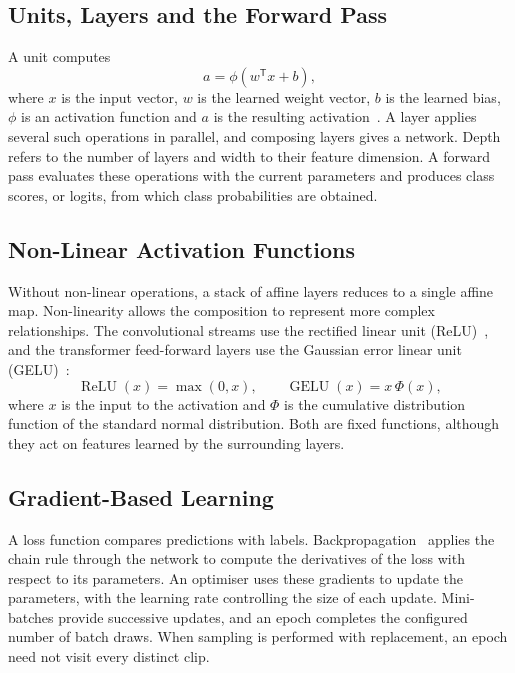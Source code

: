 \subsection{Units, Layers and the Forward Pass}
\label{sec:units-layers}

A unit computes
\begin{equation}
	a=\phi(w^{\mathsf T}x+b),
	\label{eq:unit}
\end{equation}
where $x$ is the input vector, $w$ is the learned weight vector, $b$ is the learned bias, $\phi$ is an activation function and $a$ is the resulting activation~\cite{goodfellow2016}. A layer applies several such operations in parallel, and composing layers gives a network. Depth refers to the number of layers and width to their feature dimension. A forward pass evaluates these operations with the current parameters and produces class scores, or logits, from which class probabilities are obtained.

\subsection{Non-Linear Activation Functions}
\label{sec:non-linearity}

Without non-linear operations, a stack of affine layers reduces to a single affine map. Non-linearity allows the composition to represent more complex relationships. The convolutional streams use the rectified linear unit (ReLU)~\cite{nair2010}, and the transformer feed-forward layers use the Gaussian error linear unit (GELU)~\cite{hendrycks2016}:
\begin{equation}
	\operatorname{ReLU}(x)=\max(0,x),
	\qquad
	\operatorname{GELU}(x)=x\,\Phi(x),
	\label{eq:activations}
\end{equation}
where $x$ is the input to the activation and $\Phi$ is the cumulative distribution function of the standard normal distribution. Both are fixed functions, although they act on features learned by the surrounding layers.

\subsection{Gradient-Based Learning}
\label{sec:gradient-descent}

A loss function compares predictions with labels. Backpropagation~\cite{rumelhart1986} applies the chain rule through the network to compute the derivatives of the loss with respect to its parameters. An optimiser uses these gradients to update the parameters, with the learning rate controlling the size of each update. Mini-batches provide successive updates, and an epoch completes the configured number of batch draws. When sampling is performed with replacement, an epoch need not visit every distinct clip.

